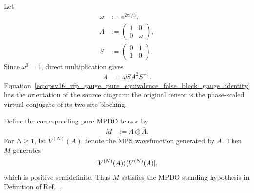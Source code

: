 \documentclass{article}
\begin{document}
Let
\begin{align}
    \omega
        &:= e^{2\pi i/3},
    \label{eq:cpsv16_rfp_gauge_pure_equivalence_false_cube_root}\\
    A
        &:= \begin{pmatrix}
            1 & 0\\
            0 & \omega
        \end{pmatrix},
    \label{eq:cpsv16_rfp_gauge_pure_equivalence_false_phase_tensor}\\
    S
        &:= \begin{pmatrix}
            0 & 1\\
            1 & 0
        \end{pmatrix}.
    \label{eq:cpsv16_rfp_gauge_pure_equivalence_false_swap_matrix}
\end{align}
Since $\omega^3=1$, direct multiplication gives
\begin{align}
    A
        &= \omega S A^2S^{-1}.
    \label{eq:cpsv16_rfp_gauge_pure_equivalence_false_block_gauge_identity}
\end{align}
Equation~\ref{eq:cpsv16_rfp_gauge_pure_equivalence_false_block_gauge_identity}
has the orientation of the source diagram: the original tensor is the
phase-scaled virtual conjugate of its two-site blocking.

Define the corresponding pure MPDO tensor by
\begin{align}
    M
        &:= A\otimes\overline A.
    \label{eq:cpsv16_rfp_gauge_pure_equivalence_false_doubled_tensor}
\end{align}
For $N\geq 1$, let $V^{(N)}(A)$ denote the MPS wavefunction generated by $A$.
Then $M$ generates
\begin{align}
    |V^{(N)}(A)\rangle\langle V^{(N)}(A)|,
    \label{eq:cpsv16_rfp_gauge_pure_equivalence_false_rank_one_mpdo}
\end{align}
which is positive semidefinite. Thus $M$ satisfies the MPDO standing
hypothesis in Definition  of
Ref.~\cite{Cirac2016MPDO_arXiv}.
\end{document}
